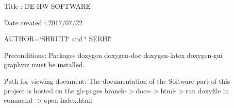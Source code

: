 Title \+: D\+E-\/\+HW S\+O\+F\+T\+W\+A\+RE

Date created \+: 2017/07/22

A\+U\+T\+H\+OR=\char`\"{}\+S\+H\+R\+U\+T\+I\char`\"{} and \char`\"{} S\+E\+R\+H\+I\char`\"{}

Preconditions\+: Packages doxygen doxygen-\/doc doxygen-\/latex doxygen-\/gui graphviz must be installed.

Path for viewing document\+: The documentation of the Software part of this project is hosted on the gh-\/pages branch-\/$>$docs-\/$>$html-\/$>$run doxyfile in command-\/$>$open \textquotesingle{}index.\+html 